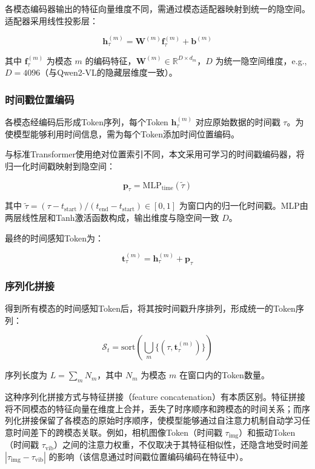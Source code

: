 \documentclass[12pt,a4paper]{article}
\begin{document}
各模态编码器输出的特征向量维度不同，需通过模态适配器映射到统一的隐空间。适配器采用线性投影层：

\[
\mathbf{h}_{\tau}^{(m)} = \mathbf{W}^{(m)} \mathbf{f}_{\tau}^{(m)} + \mathbf{b}^{(m)}
\]

其中 \(\mathbf{f}_{\tau}^{(m)}\) 为模态 \(m\) 的编码特征，\(\mathbf{W}^{(m)} \in \mathbb{R}^{D \times d_m}\)，\(D\) 为统一隐空间维度，e.g., \(D = 4096\)（与Qwen2-VL的隐藏层维度一致）。

\subsubsection{时间戳位置编码}

各模态经编码后形成Token序列，每个Token \(\mathbf{h}_{\tau}^{(m)}\) 对应原始数据的时间戳 \(\tau\)。为使模型能够利用时间信息，需为每个Token添加时间位置编码。

与标准Transformer使用绝对位置索引不同，本文采用可学习的时间戳编码器，将归一化时间戳映射到隐空间：

\[
\mathbf{p}_{\tau} = \text{MLP}_{\text{time}}(\tilde{\tau})
\]

其中 \(\tilde{\tau} = (\tau - t_{\text{start}}) / (t_{\text{end}} - t_{\text{start}}) \in [0,1]\) 为窗口内的归一化时间戳。MLP由两层线性层和Tanh激活函数构成，输出维度与隐空间一致 \(D\)。

最终的时间感知Token为：

\[
\mathbf{t}_{\tau}^{(m)} = \mathbf{h}_{\tau}^{(m)} + \mathbf{p}_{\tau}
\]

\subsubsection{序列化拼接}

得到所有模态的时间感知Token后，将其按时间戳升序排列，形成统一的Token序列：

\[
\mathcal{S}_t = \text{sort}\left( \bigcup_{m} \{ (\tau, \mathbf{t}_{\tau}^{(m)}) \} \right)
\]

序列长度为 \(L = \sum_m N_m\)，其中 \(N_m\) 为模态 \(m\) 在窗口内的Token数量。

这种序列化拼接方式与特征拼接（feature concatenation）有本质区别。特征拼接将不同模态的特征向量在维度上合并，丢失了时序顺序和跨模态的时间关系；而序列化拼接保留了各模态的原始时序顺序，使模型能够通过自注意力机制自动学习任意时间差下的跨模态关联。例如，相机图像Token（时间戳 \(\tau_{\text{img}}\)）和振动Token（时间戳 \(\tau_{\text{vib}}\)）之间的注意力权重，不仅取决于其特征相似性，还隐含地受时间差 \(|\tau_{\text{img}} - \tau_{\text{vib}}|\) 的影响（该信息通过时间戳位置编码编码在特征中）。
\end{document}
